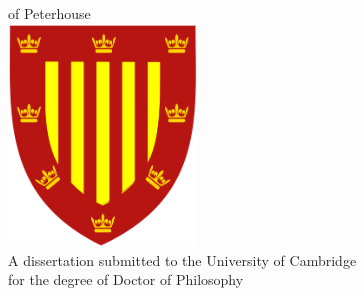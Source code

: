 \begin{center}%
	\begin{doublespace}%
		{\Huge\textbf{\thetitle}}\\%
	\end{doublespace}%
	\vspace*{3cm}%
	{\Large{\theauthor} \\ of Peterhouse }\\%
	\vspace*{3cm}%
	\includegraphics[width=5cm]{Peterhouse.png} \\
	\vspace*{2cm}
	{A dissertation submitted to the University of Cambridge\\ for the degree of Doctor of Philosophy}
\end{center}%
\begin{abstract}%
The Standard Model has been a successful theory in describing the behaviour of fundamental particles, but there are still problems remaining unsolved. New theoretical models are therefore proposed to answer those questions with either new interactions or new particles. This thesis is presenting the searches for new physics with dibosn signatures in the two forms from LHC $\sqrt{s}=13~TeV$ collisions with the ATLAS detector. The data was collected in 2015 and 2016 corresponding to the integrated luminosity of $36.1~fb^{-1}$
\\
\\And, both the LHC and ATLAS detector are now going through the upgrades for the operation in 2021 with the $\sqrt{s}=14TeV$ collisions. This thesis will also show the ongoing upgrade work for the hardware calorimeter trigger in the simulation and study in the proposed algorithms for object reconstruction.  
\end{abstract}


